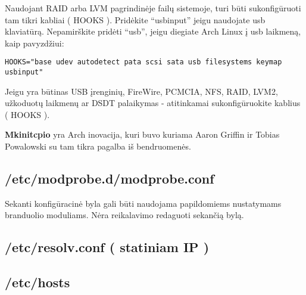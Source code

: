   Naudojant RAID arba LVM pagrindinėje failų sistemoje, turi būti
  sukonfigūruoti tam tikri kabliai ( HOOKS ). Pridėkite ``usbinput''
  jeigu naudojate usb klaviatūrą. Nepamirškite pridėti ``usb'', jeigu
  diegiate Arch Linux į usb laikmeną, kaip pavyzdžiui:

  \begin{verbatim}
HOOKS="base udev autodetect pata scsi sata usb filesystems keymap usbinput"
  \end{verbatim}

  Jeigu yra būtinas USB įrenginių, FireWire, PCMCIA, NFS, RAID, LVM2,
  užkoduotų laikmenų ar DSDT palaikymas - atitinkamai sukonfigūruokite
  kablius ( HOOKS ).

  \textbf{Mkinitcpio} yra Arch inovacija, kuri buvo kuriama Aaron
  Griffin ir Tobias Powalowski su tam tikra pagalba iš bendruomenės. 

\subsection{/etc/modprobe.d/modprobe.conf}

  Sekanti konfigūracinė byla gali būti naudojama papildomiems
  nustatymams branduolio moduliams. Nėra reikalavimo redaguoti
  sekančią bylą.

\subsection{/etc/resolv.conf ( statiniam IP )}

  

\subsection{/etc/hosts}
